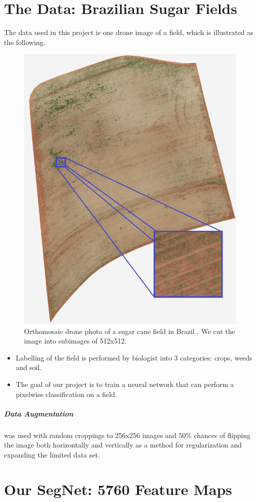 \documentclass[
    ,title     = {{Image Segmentation for Smart Agriculture}}
    ,subject   = {{This is the subject of my work}}
    ,papersize = {{a1paper}}
    ,nocrop
]{dtuposter}
\begin{document}
\begin{dtupostercontent}
\section{The Data: Brazilian Sugar Fields}
The data used in this project is one drone image of a field, which is illustrated as the following.
\begin{figure}
\centering
\includegraphics[width=.7\linewidth]{raw-min3}
\caption{Orthomosaic drone photo of a sugar cane field in Brazil \cite{USC}. We cut the image into subimages of 512x512.}
\end{figure}
\begin{itemize}
	\item Labelling of the field is performed by biologist into 3 categories: crops, weeds and soil.
	\item The goal of our project is to train a neural network that can perform a pixelwise classification on a field.
\end{itemize}
\subparagraph{Data Augmentation} was used with random croppings to 256x256 images and \(50 \%\) chances of flipping the image both horizontally and vertically as a method for regularization and expanding the limited data set.
\section{Our SegNet: 5760 Feature Maps}




\end{dtupostercontent}
\end{document}
